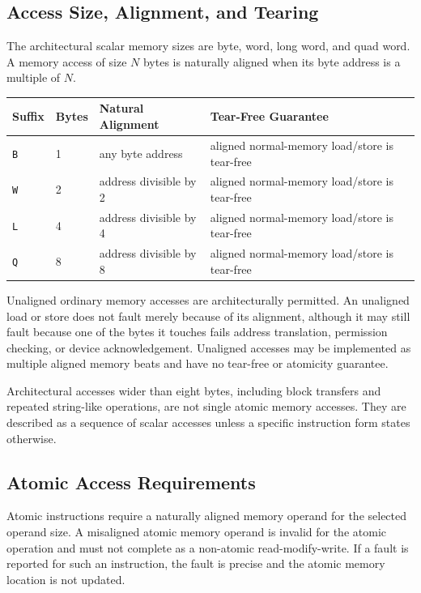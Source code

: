 \subsection{Access Size, Alignment, and Tearing}
The architectural scalar memory sizes are byte, word, long word, and quad word. A memory
access of size \(N\) bytes is naturally aligned when its byte address is a multiple of \(N\).

\begingroup\footnotesize
\begin{longtable}{@{}p{0.75in}p{0.85in}p{1.25in}p{2.65in}@{}}
\toprule
\textbf{Suffix} & \textbf{Bytes} & \textbf{Natural Alignment} & \textbf{Tear-Free Guarantee}\\
\midrule
\endhead
\texttt{B} & 1 & any byte address & aligned normal-memory load/store is tear-free\\
\texttt{W} & 2 & address divisible by 2 & aligned normal-memory load/store is tear-free\\
\texttt{L} & 4 & address divisible by 4 & aligned normal-memory load/store is tear-free\\
\texttt{Q} & 8 & address divisible by 8 & aligned normal-memory load/store is tear-free\\
\bottomrule
\end{longtable}
\endgroup

Unaligned ordinary memory accesses are architecturally permitted. An unaligned load or
store does not fault merely because of its alignment, although it may still fault because
one of the bytes it touches fails address translation, permission checking, or device
acknowledgement. Unaligned accesses may be implemented as multiple aligned memory beats
and have no tear-free or atomicity guarantee.

Architectural accesses wider than eight bytes, including block transfers and repeated
string-like operations, are not single atomic memory accesses. They are described as a
sequence of scalar accesses unless a specific instruction form states otherwise.

\subsection{Atomic Access Requirements}
Atomic instructions require a naturally aligned memory operand for the selected operand
size. A misaligned atomic memory operand is invalid for the atomic operation and must not
complete as a non-atomic read-modify-write. If a fault is reported for such an instruction,
the fault is precise and the atomic memory location is not updated.

